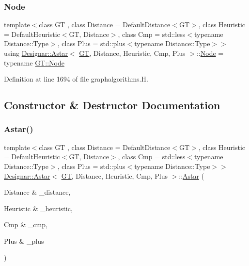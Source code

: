 \subsubsection{\texorpdfstring{Node}{Node}}
{\footnotesize\ttfamily template$<$class GT , class Distance  = Default\+Distance$<$\+G\+T$>$, class Heuristic  = Default\+Heuristic$<$\+G\+T, Distance$>$, class Cmp  = std\+::less$<$typename Distance\+::\+Type$>$, class Plus  = std\+::plus$<$typename Distance\+::\+Type$>$$>$ \\
using \hyperlink{class_designar_1_1_astar}{Designar\+::\+Astar}$<$ \hyperlink{demo-buildgraph_8_c_a3001c40d2c31ca87ed96cd7d1334a55e}{GT}, Distance, Heuristic, Cmp, Plus $>$\+::\hyperlink{class_designar_1_1_astar_a0d4cdf6b94255824c6c93e5ae18e9eb7}{Node} =  typename \hyperlink{class_designar_1_1_graph_a5dfc7dba9d092ac489c72e40390c37d0}{G\+T\+::\+Node}}



Definition at line 1694 of file graphalgorithms.\+H.



\subsection{Constructor \& Destructor Documentation}
\mbox{\label{class_designar_1_1_astar_a9a684bbaa799da107f42ed8e048cac57}} 
\subsubsection{\texorpdfstring{Astar()}{Astar()}\hspace{0.1cm}{\footnotesize\ttfamily [1/2]}}
{\footnotesize\ttfamily template$<$class GT , class Distance  = Default\+Distance$<$\+G\+T$>$, class Heuristic  = Default\+Heuristic$<$\+G\+T, Distance$>$, class Cmp  = std\+::less$<$typename Distance\+::\+Type$>$, class Plus  = std\+::plus$<$typename Distance\+::\+Type$>$$>$ \\
\hyperlink{class_designar_1_1_astar}{Designar\+::\+Astar}$<$ \hyperlink{demo-buildgraph_8_c_a3001c40d2c31ca87ed96cd7d1334a55e}{GT}, Distance, Heuristic, Cmp, Plus $>$\+::\hyperlink{class_designar_1_1_astar}{Astar} (\begin{DoxyParamCaption}\item[{Distance \&}]{\+\_\+distance,  }\item[{Heuristic \&}]{\+\_\+heuristic,  }\item[{Cmp \&}]{\+\_\+cmp,  }\item[{Plus \&}]{\+\_\+plus }\end{DoxyParamCaption})\hspace{0.3cm}{\ttfamily [inline]}}



